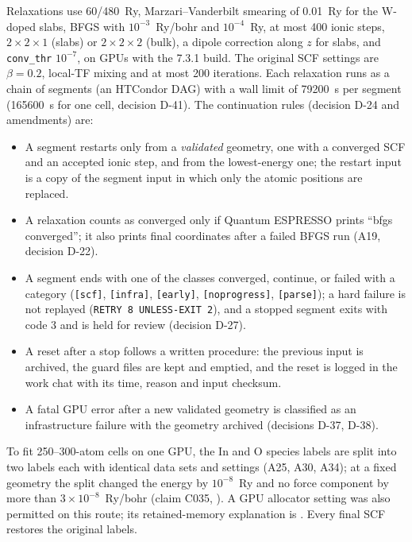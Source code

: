 Relaxations use 60/480~Ry, Marzari--Vanderbilt smearing of 0.01~Ry for the W-doped slabs, BFGS with
$10^{-3}$~Ry/bohr and $10^{-4}$~Ry, at most 400 ionic steps, $2\times2\times1$ (slabs) or $2\times2\times2$ (bulk), a
dipole correction along $z$ for slabs, and \texttt{conv\_thr} $10^{-7}$, on GPUs with the 7.3.1 build. %
The original SCF settings are $\beta = 0.2$, local-TF mixing and at most 200 iterations. %
Each relaxation runs as a chain of segments (an HTCondor DAG) with a wall limit of \SI{79200}{s} per segment
(\SI{165600}{s} for one cell, decision D-41). %
The continuation rules (decision D-24 and amendments) are:
\begin{itemize}
\item A segment restarts only from a \emph{validated} geometry, one with a converged SCF and an accepted ionic step,
and from the lowest-energy one; the restart input is a copy of the segment input in which only the atomic positions
are replaced. %
\item A relaxation counts as converged only if Quantum ESPRESSO prints ``bfgs converged''; it also prints final
coordinates after a failed BFGS run (A19, decision D-22). %
\item A segment ends with one of the classes converged, continue, or failed with a category (\texttt{[scf]},
\texttt{[infra]}, \texttt{[early]}, \texttt{[noprogress]}, \texttt{[parse]}); a hard failure is not replayed
(\texttt{RETRY 8 UNLESS-EXIT 2}), and a stopped segment exits with code 3 and is held for review (decision D-27). %
\item A reset after a stop follows a written procedure: the previous input is archived, the guard files are kept and
emptied, and the reset is logged in the work chat with its time, reason and input checksum. %
\item A fatal GPU error after a new validated geometry is classified as an infrastructure failure with the geometry
archived (decisions D-37, D-38). %
\end{itemize}
To fit 250--300-atom cells on one GPU, the In and O species labels are split into two labels each with identical data
sets and settings (A25, A30, A34); at a fixed geometry the split changed the energy by $10^{-8}$~Ry and no force
component by more than $3\times10^{-8}$~Ry/bohr (claim C035, ). %
A GPU allocator setting was also permitted on this route; its retained-memory explanation is . %
Every final SCF restores the original labels. %

